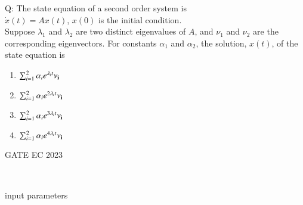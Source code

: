\documentclass[journal,12pt,onecolumn]{IEEEtran}
\theoremstyle{remark}
\begin{document}
\let\vec\mathbf







\bigskip


Q: The state equation of a second order system is \\
$ \dot{{x}}(t) = A{x}(t)$, \quad ${x}(0)$ is the initial condition. \\
Suppose $\lambda_1$ and $\lambda_2$ are two distinct eigenvalues of $A$, and $\nu_1$ and $\nu_2$ are the corresponding eigenvectors. For constants $\alpha_1$ and $\alpha_2$, the solution, ${x}(t)$, of the state equation is \\
\begin{enumerate}[label=(\Alph*)]
\item $\sum_{i=1}^{2} \alpha_ie^{\lambda_it}\bf{\nu}_i$
\item $\sum_{i=1}^{2} \alpha_ie^{2\lambda_it}\bf{\nu}_i$
\item $\sum_{i=1}^{2} \alpha_ie^{3\lambda_it}\bf{\nu}_i$
\item $\sum_{i=1}^{2} \alpha_ie^{4\lambda_it}\bf{\nu}_i$
\end{enumerate}
\hfill{GATE EC 2023}


\solution \\
\fi
\begin{table}[!ht]
    \centering
        
    \caption{input parameters}
    \label{tab:gate23EC43.1}
\end{table}
\end{document}
